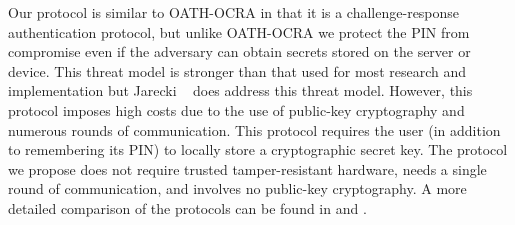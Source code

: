 Our protocol is similar to OATH-OCRA in that it is a challenge-response authentication protocol, but unlike OATH-OCRA we protect the PIN from compromise even if the adversary can obtain secrets stored on the server or device.
This threat model is stronger than that used for most research and implementation but Jarecki \etal~\cite{JareckiJKSS21} does address this threat model.
However, this protocol imposes high costs due to the use of public-key cryptography and numerous rounds of communication. 
This protocol requires the user (in addition to remembering its PIN) to locally store a cryptographic secret key. The protocol we propose does not require trusted tamper-resistant hardware, needs a single round of communication, and involves no public-key cryptography.
A more detailed comparison of the protocols can be found in  and .



